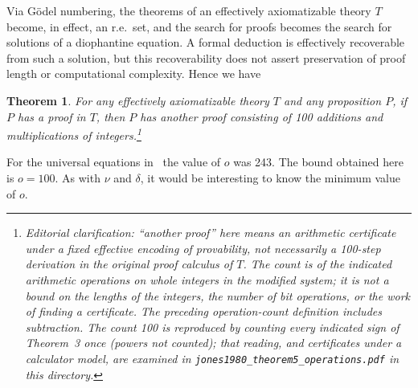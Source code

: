\documentclass[11pt,letterpaper]{article}
\newtheorem{theorem}{Theorem}
\begin{document}
Via G\"odel numbering, the theorems of an effectively axiomatizable theory
$T$ become, in effect, an r.e.\ set, and the search for proofs becomes the
search for solutions of a diophantine equation. A formal deduction is effectively recoverable from such a solution,
but this recoverability does not assert preservation of proof length
or computational complexity. Hence we have

\begin{theorem}
For any effectively axiomatizable theory $T$ and any proposition $P$, if
$P$ has a proof in $T$, then $P$ has another proof consisting of
100 additions and multiplications of integers.\footnote{Editorial
clarification: ``another proof'' here means an arithmetic certificate
under a fixed effective encoding of provability, not necessarily a
100-step derivation in the original proof calculus of $T$. The count is
of the indicated arithmetic operations on whole integers in the modified
system; it is not a bound on the lengths of the integers, the number of
bit operations, or the work of finding a certificate. The preceding
operation-count definition includes subtraction. The count 100 is
reproduced by counting every indicated sign of Theorem~3 once (powers not
counted); that reading, and certificates under a calculator model, are
examined in \texttt{jones1980\_theorem5\_operations.pdf} in this directory.}
\end{theorem}

For the universal equations in~\cite{Jones78} the value of $o$ was 243.
The bound obtained here is $o=100$. As with $\nu$ and $\delta$, it would be
interesting to know the minimum value of $o$.
\end{document}
